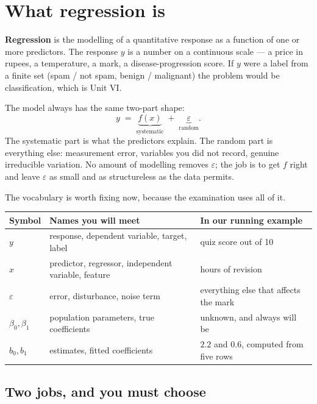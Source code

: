 \documentclass[11pt]{article}
\begin{document}
\section{What regression is}
\label{sec:intro}

\textbf{Regression} is the modelling of a quantitative response as a function
of one or more predictors. The response $y$ is a number on a continuous
scale --- a price in rupees, a temperature, a mark, a disease-progression
score. If $y$ were a label from a finite set (spam / not spam, benign /
malignant) the problem would be classification, which is Unit VI.

The model always has the same two-part shape:
\begin{equation}
  y \;=\; \underbrace{f(x)}_{\text{systematic}} \;+\;
          \underbrace{\varepsilon}_{\text{random}} .
  \label{eq:shape}
\end{equation}
The systematic part is what the predictors explain. The random part is
everything else: measurement error, variables you did not record, genuine
irreducible variation. No amount of modelling removes $\varepsilon$; the job
is to get $f$ right and leave $\varepsilon$ as small and as structureless as
the data permits.

The vocabulary is worth fixing now, because the examination uses all of it.

\begin{center}\small
\begin{tabular}{@{}lll@{}}
  \toprule
  Symbol & Names you will meet & In our running example\\
  \midrule
  $y$ & response, dependent variable, target, label &
    quiz score out of 10\\
  $x$ & predictor, regressor, independent variable, feature &
    hours of revision\\
  $\varepsilon$ & error, disturbance, noise term &
    everything else that affects the mark\\
  $\beta_0,\beta_1$ & population parameters, true coefficients &
    unknown, and always will be\\
  $b_0,b_1$ & estimates, fitted coefficients &
    $2.2$ and $0.6$, computed from five rows\\
  \bottomrule
\end{tabular}
\end{center}

\subsection{Two jobs, and you must choose}
\end{document}
